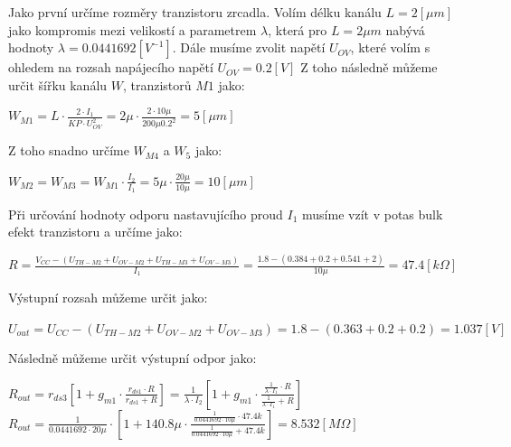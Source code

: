 Jako první určíme rozměry tranzistoru zrcadla.
Volím délku kanálu \(L = 2 [\mu m]\) jako kompromis mezi velikostí a parametrem \(\lambda\), která pro \(L = 2 \mu m\) nabývá hodnoty \(\lambda = 0.0441692 [V^{-1}]\).
Dále musíme zvolit napětí \(U_{OV}\), které volím s ohledem na rozsah napájecího napětí \(U_{OV} = 0.2 [V]\)
Z toho následně můžeme určit šířku kanálu \(W\), tranzistorů \(M1\) jako:

\begin{center}
    \large
    \(
        W_{M1} = L \cdot \frac{2 \cdot I_1}{KP \cdot U_{OV}^2} = 2\mu \cdot \frac{2 \cdot 10\mu}{200\mu 0.2^2} = 5 [\mu m]
    \)
\end{center}

Z toho snadno určíme \(W_{M4}\) a \(W_{5}\) jako:

\begin{center}
    \large
    \(
        W_{M2} = W_{M3} = W_{M1} \cdot \frac{I_2}{I_1} = 5\mu \cdot \frac{20\mu}{10\mu} = 10 [\mu m]
    \)
\end{center}

Při určování hodnoty odporu nastavujícího proud \(I_1\) musíme vzít v potas bulk efekt tranzistoru  a určíme jako:

\begin{center}
    \large
    \(
        R = \frac{V_{CC} - (U_{TH-M2} + U_{OV-M2} + U_{TH-M3} + U_{OV-M3})}{I_1} = \frac{1.8 - (0.384 + 0.2 + 0.541 + 2)}{10\mu} = 47.4 [k\Omega] 
    \)
\end{center}

Výstupní rozsah můžeme určit jako:
\begin{center}
    \large
    \(
        U_{out} = U_{CC} - (U_{TH-M2} + U_{OV-M2} + U_{OV-M3}) = 1.8 - (0.363+0.2+0.2) = 1.037 [V]
    \)
\end{center}

Následně můžeme určit výstupní odpor jako:
\begin{center}
    \Large
    \(
        R_{out} = r_{ds3} \left[ 1 + g_{m1} \cdot \frac{r_{ds1} \cdot R}{r_{ds1} + R} \right] = \frac{1}{\lambda \cdot I_2} \left[ 1 + g_{m1} \cdot \frac{\frac{1}{\lambda \cdot I_1} \cdot R}{\frac{1}{\lambda \cdot I_1} + R} \right]
    \)
    \(
        R_{out} = \frac{1}{0.0441692 \cdot 20\mu} \cdot \left[ 1 +  140.8\mu \cdot \frac{\frac{1}{0.0441692 \cdot 10\mu} \cdot 47.4k}{\frac{1}{0.0441692 \cdot 10\mu} + 47.4k}\right] = 8.532 [M\Omega]
    \)
\end{center}

